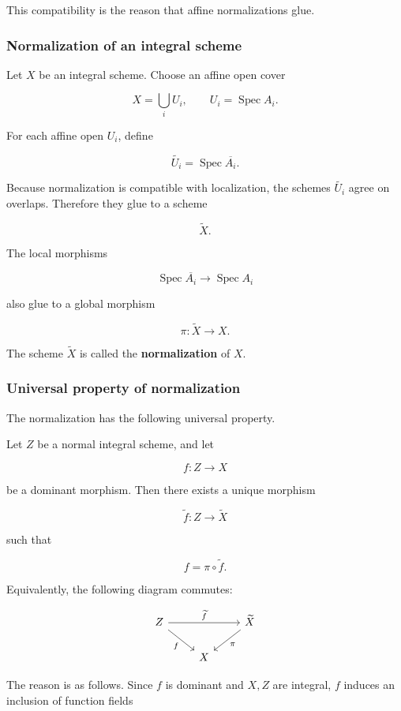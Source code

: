 \documentclass[12pt,a4paper]{article}
\theoremstyle{notespace}
\begin{document}
This compatibility is the reason that affine normalizations glue.

\subsubsection{Normalization of an integral scheme}

Let \(X\) be an integral scheme. Choose an affine open cover

\[
X=\bigcup_i U_i,
\qquad
U_i=\operatorname{Spec}A_i.
\]

For each affine open \(U_i\), define

\[
\widetilde{U_i}=\operatorname{Spec}\overline{A_i}.
\]

Because normalization is compatible with localization, the schemes \(\widetilde{U_i}\) agree on overlaps. Therefore they glue to a scheme

\[
\widetilde{X}.
\]

The local morphisms

\[
\operatorname{Spec}\overline{A_i}\to \operatorname{Spec}A_i
\]

also glue to a global morphism

\[
\pi:\widetilde{X}\to X.
\]

The scheme \(\widetilde{X}\) is called the \textbf{normalization} of \(X\).

\subsubsection{Universal property of normalization}

The normalization has the following universal property.

Let \(Z\) be a normal integral scheme, and let

\[
f:Z\to X
\]

be a dominant morphism. Then there exists a unique morphism

\[
\widetilde{f}:Z\to \widetilde{X}
\]

such that

\[
f=\pi\circ \widetilde{f}.
\]

Equivalently, the following diagram commutes:

\[
\begin{tikzcd}
	Z \arrow[rr,"\widetilde{f}"] \arrow[dr,"f"'] & & \widetilde{X} \arrow[dl,"\pi"] \\
	& X &
\end{tikzcd}
\]

The reason is as follows. Since \(f\) is dominant and \(X,Z\) are integral, \(f\) induces an inclusion of function fields
\end{document}
